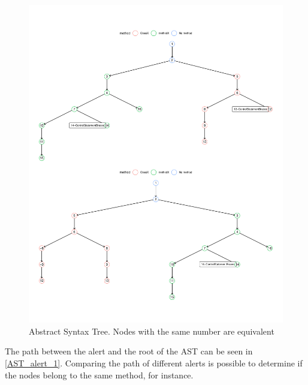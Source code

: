 \documentclass[
]{article}
\begin{document}
\begin{figure}[H]
\includegraphics[width=1\linewidth]{report_files/figure-latex/unnamed-chunk-9-1} \caption{Abstract Syntax Tree. Nodes with the same number are equivalent \label{AST_with_alerts}}\label{fig:unnamed-chunk-9}
\end{figure}

\normalsize

The path between the alert and the root of the AST can be seen in
\ref{AST_alert_1}. Comparing the path of different alerts is possible to
determine if the nodes belong to the same method, for instance.

\small
\end{document}
